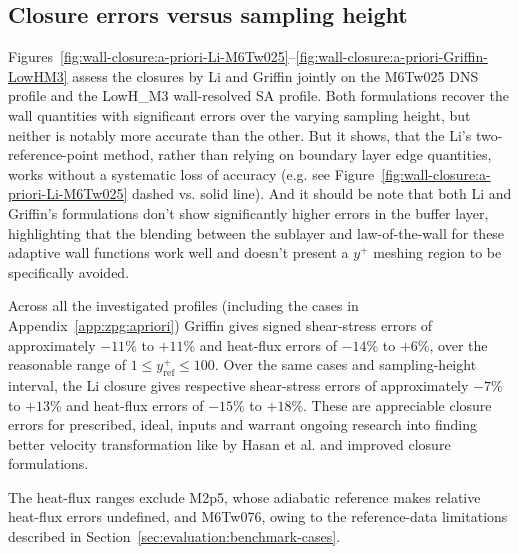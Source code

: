 \subsection{Closure errors versus sampling height}
\label{subsec:erriso:apriori-results}

Figures~\ref{fig:wall-closure:a-priori-Li-M6Tw025}--\ref{fig:wall-closure:a-priori-Griffin-LowHM3} assess the closures by Li and Griffin jointly on the M6Tw025 DNS profile and the LowH\_M3 wall-resolved SA profile. Both formulations recover the wall quantities with significant errors over the varying sampling height, but neither is notably more accurate than the other. But it shows, that the Li's two-reference-point method, rather than relying on boundary layer edge quantities, works without a systematic loss of accuracy (e.g. see Figure~\ref{fig:wall-closure:a-priori-Li-M6Tw025} dashed vs. solid line). And it should be note that both Li and Griffin's formulations don't show significantly higher errors in the buffer layer, highlighting that the blending between the sublayer and law-of-the-wall for these adaptive wall functions work well and doesn't present a \(y^+\) meshing region to be specifically avoided.
\par\medskip

Across all the investigated profiles (including the cases in Appendix~\ref{app:zpg:apriori}) Griffin gives signed shear-stress errors of approximately \(-11\%\) to \(+11\%\) and heat-flux errors of \(-14\%\) to \(+6\%\), over the reasonable range of \(1\le y_{\mathrm{ref}}^+\le100\). Over the same cases and sampling-height interval, the Li closure gives respective shear-stress errors of approximately \(-7\%\) to \(+13\%\) and heat-flux errors of \(-15\%\) to \(+18\%\). These are appreciable closure errors for prescribed, ideal, inputs and warrant ongoing research into finding better velocity transformation like by Hasan et al.\cite{hasan2023incorporating} and improved closure formulations.
\par\medskip

The heat-flux ranges exclude M2p5, whose adiabatic reference makes relative heat-flux errors undefined, and M6Tw076, owing to the reference-data limitations described in Section~\ref{sec:evaluation:benchmark-cases}.
\par\medskip

